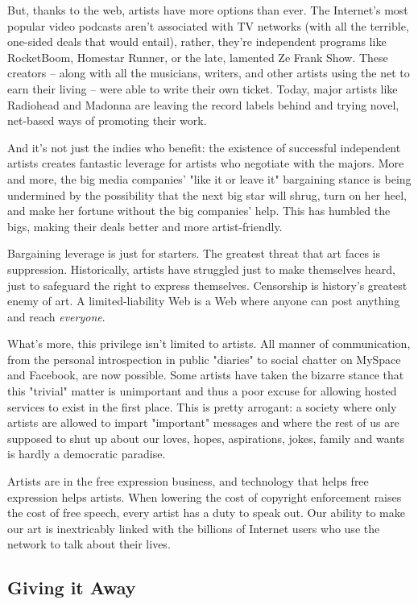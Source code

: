 But, thanks to the web, artists have more options than ever. The
Internet's most popular video podcasts aren't associated with TV
networks (with all the terrible, one-sided deals that would
entail), rather, they're independent programs like RocketBoom,
Homestar Runner, or the late, lamented Ze Frank Show. These
creators -- along with all the musicians, writers, and other
artists using the net to earn their living -- were able to write
their own ticket. Today, major artists like Radiohead and Madonna
are leaving the record labels behind and trying novel, net-based
ways of promoting their work.

And it's not just the indies who benefit: the existence of
successful independent artists creates fantastic leverage for
artists who negotiate with the majors. More and more, the big media
companies' "like it or leave it" bargaining stance is being
undermined by the possibility that the next big star will shrug,
turn on her heel, and make her fortune without the big companies'
help. This has humbled the bigs, making their deals better and more
artist-friendly.

Bargaining leverage is just for starters. The greatest threat that
art faces is suppression. Historically, artists have struggled just
to make themselves heard, just to safeguard the right to express
themselves. Censorship is history's greatest enemy of art. A
limited-liability Web is a Web where anyone can post anything and
reach \emph{everyone}.

What's more, this privilege isn't limited to artists. All manner of
communication, from the personal introspection in public "diaries"
to social chatter on MySpace and Facebook, are now possible. Some
artists have taken the bizarre stance that this "trivial" matter is
unimportant and thus a poor excuse for allowing hosted services to
exist in the first place. This is pretty arrogant: a society where
only artists are allowed to impart "important" messages and where
the rest of us are supposed to shut up about our loves, hopes,
aspirations, jokes, family and wants is hardly a democratic
paradise.

Artists are in the free expression business, and technology that
helps free expression helps artists. When lowering the cost of
copyright enforcement raises the cost of free speech, every artist
has a duty to speak out. Our ability to make our art is
inextricably linked with the billions of Internet users who use the
network to talk about their lives.

\subsection{Giving it Away}

